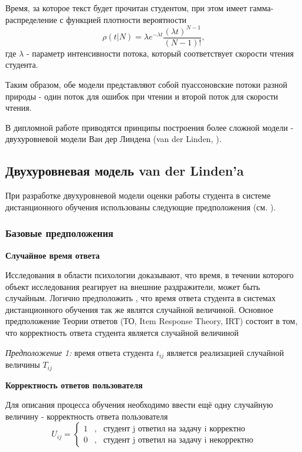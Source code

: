 Время, за которое текст будет прочитан студентом, при этом имеет гамма-распределение с функцией плотности вероятности
\begin{equation}
\rho (t | N) = \lambda e^{-\lambda t}\frac{(\lambda t)^{N-1}}{(N-1)!},
\end{equation}
где $\lambda$ - параметр интенсивности потока, который соответствует скорости чтения студента.

Таким образом, обе модели представляют собой пуассоновские потоки разной природы - один поток для ошибок при чтении и второй поток для скорости чтения.

В дипломной работе приводятся принципы построения более сложной модели - двухуровневой модели Ван дер Линдена (van der Linden, \cite{1.,7.,8.}).

\subsection{Двухуровневая модель van der Linden'a}

При разработке двухуровневой модели оценки работы студента в системе дистанционного обучения использованы следующие предположения (см. \cite{8.}).

\subsubsection{Базовые предположения}

{\bfseries Случайное время ответа}

Исследования в области психологии доказывают, что время, в течении которого объект исследования реагирует на внешние раздражители, может быть случайным. Логично предположить , что время ответа студента в сис\-темах дистанционного обучения так же являтся случайной величиной. Ос\-новное предположение Теории ответов (ТО, Item Response Theory, IRT) со\-стоит в том, что корректность ответа студента является случайной величиной

{\itshape Предположение 1:} время ответа студента $t_{ij}$ является реализацией слу\-чайной величины $T_{ij}$

{\bfseries Корректность ответов пользователя}

Для описания процесса обучения необходимо ввести ещё одну слу\-чайную величину - корректность ответа пользователя
$$
U_{ij} = 
\left\{
\begin{array}{ccl}
1 &,& \mbox{студент j ответил на задачу i корректно}\\
0 &,& \mbox{студент j ответил на задачу i некорректно}
\end{array}
\right.
$$

